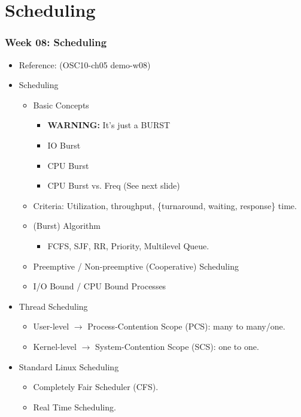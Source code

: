 \documentclass[aspectratio=169, xcolor=table, notheorems, hyperref={pdfpagelabels=false}]{beamer}
\begin{document}
\section{Scheduling}
\begin{frame}
\frametitle{Week 08: Scheduling}
\begin{itemize}
\item Reference: (OSC10-ch05 demo-w08)
\item Scheduling
\begin{itemize}
\item Basic Concepts
\begin{itemize}
\item \textbf{WARNING:} It's just a BURST
\item IO Burst
\item CPU Burst
\item CPU Burst vs. Freq (See next slide)
\end{itemize}
\item Criteria: Utilization, throughput, \{turnaround, waiting,  response\} time.
\item (Burst) Algorithm
\begin{itemize}
\item FCFS, SJF, RR, Priority, Multilevel Queue.
\end{itemize}
\item Preemptive / Non-preemptive (Cooperative) Scheduling
\item I/O Bound / CPU Bound Processes
\end{itemize}
\item Thread Scheduling
\begin{itemize}
\item User-level $\rightarrow$ Process-Contention Scope (PCS): many to many/one.
\item Kernel-level $\rightarrow$ System-Contention Scope (SCS): one to one.
\end{itemize}
\item Standard Linux Scheduling
\begin{itemize}
\item Completely Fair Scheduler (CFS).
\item Real Time Scheduling.
\end{itemize}
\end{itemize}
\end{frame}

\end{document}
